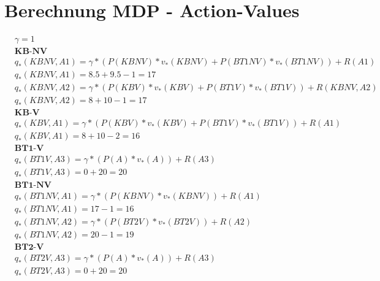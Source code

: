 \section{Berechnung MDP - Action-Values}
\label{appendix:action-values}
\begin{align}
&\gamma=1\nonumber\\
&\textbf{KB-NV} \nonumber\\
&q_*(KBNV,A1) = \gamma *(P(KBNV)* v_*(KBNV)+ P(BT1NV)* v_*(BT1NV))+R(A1) \nonumber \\
&q_*(KBNV,A1)= 8.5 +  9.5 -1= 17\\
&q_*(KBNV,A2) = \gamma *(P(KBV)* v_*(KBV)+ P(BT1V)* v_*(BT1V)) +R(KBNV, A2)\nonumber \\
&q_*(KBNV,A2)= 8 +  10 -1 = 17\\
&\textbf{KB-V} \nonumber\\
&q_*(KBV,A1) = \gamma *(P(KBV)* v_*(KBV)+ P(BT1V)* v_*(BT1V)) + R(A1) \nonumber \\
&q_*(KBV,A1)= 8 +  10-2 = 16\\
&\textbf{BT1-V} \nonumber\\
&q_*(BT1V,A3) = \gamma *(P(A)* v_*(A)) + R(A3) \nonumber \\
&q_*(BT1V,A3)= 0 +20 = 20\\
&\textbf{BT1-NV} \nonumber\\
&q_*(BT1NV,A1) = \gamma *(P(KBNV)* v_*(KBNV))+R(A1) \nonumber \\
&q_*(BT1NV,A1)= 17 -1= 16\\
&q_*(BT1NV,A2) = \gamma *(P(BT2V)* v_*(BT2V)) +R(A2)\nonumber \\
&q_*(BT1NV,A2)= 20 -1 = 19\\
&\textbf{BT2-V} \nonumber\\
&q_*(BT2V,A3) = \gamma *(P(A)* v_*(A)) + R(A3) \nonumber \\
&q_*(BT2V,A3)= 0 +20 = 20
\end{align}
